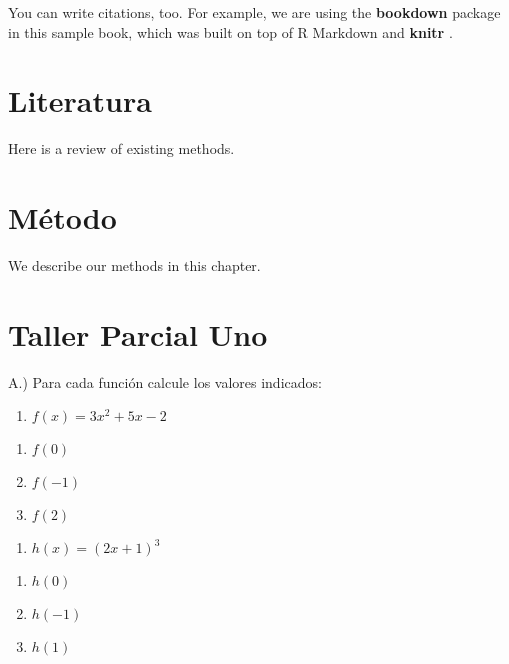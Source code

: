 \documentclass[]{book}
\providecommand{\tightlist}{%
  \setlength{\itemsep}{0pt}\setlength{\parskip}{0pt}}
\theoremstyle{definition}
\theoremstyle{definition}
\theoremstyle{definition}
\theoremstyle{remark}
\begin{document}
You can write citations, too. For example, we are using the \textbf{bookdown} package \citep{R-bookdown} in this sample book, which was built on top of R Markdown and \textbf{knitr} \citep{xie2015}.

\hypertarget{literatura}{%
\chapter{Literatura}\label{literatura}}

Here is a review of existing methods.

\hypertarget{muxe9todo}{%
\chapter{Método}\label{muxe9todo}}

We describe our methods in this chapter.

\hypertarget{taller-parcial-uno}{%
\chapter{Taller Parcial Uno}\label{taller-parcial-uno}}

A.) Para cada función calcule los valores indicados:

\begin{enumerate}
\def\labelenumi{\arabic{enumi}.}
\tightlist
\item
  \(f(x)=3x^{2}+5x-2\)
\end{enumerate}

\begin{enumerate}
\def\labelenumi{\alph{enumi}.}
\tightlist
\item
  \(f(0)\)
\item
  \(f(-1)\)
\item
  \(f(2)\)
\end{enumerate}

\begin{enumerate}
\def\labelenumi{\arabic{enumi}.}
\setcounter{enumi}{1}
\tightlist
\item
  \(h(x)=(2x+1)^{3}\)
\end{enumerate}

\begin{enumerate}
\def\labelenumi{\alph{enumi}.}
\tightlist
\item
  \(h(0)\)
\item
  \(h(-1)\)
\item
  \(h(1)\)
\end{enumerate}
\end{document}
